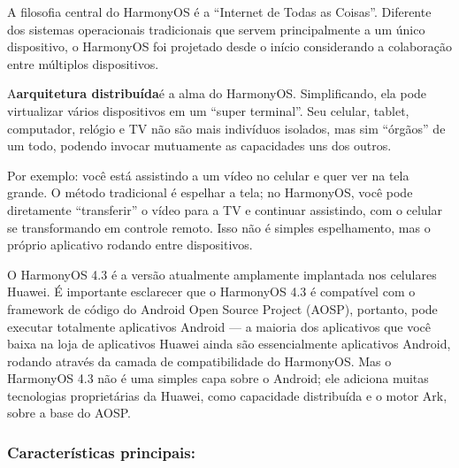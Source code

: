 


A filosofia central do HarmonyOS é a “Internet de Todas as Coisas”. Diferente dos sistemas operacionais tradicionais que servem principalmente a um único dispositivo, o HarmonyOS foi projetado desde o início considerando a colaboração entre múltiplos dispositivos.

A\textbf{arquitetura distribuída}é a alma do HarmonyOS. Simplificando, ela pode virtualizar vários dispositivos em um “super terminal”. Seu celular, tablet, computador, relógio e TV não são mais indivíduos isolados, mas sim “órgãos” de um todo, podendo invocar mutuamente as capacidades uns dos outros.

Por exemplo: você está assistindo a um vídeo no celular e quer ver na tela grande. O método tradicional é espelhar a tela; no HarmonyOS, você pode diretamente “transferir” o vídeo para a TV e continuar assistindo, com o celular se transformando em controle remoto. Isso não é simples espelhamento, mas o próprio aplicativo rodando entre dispositivos.


O HarmonyOS 4.3 é a versão atualmente amplamente implantada nos celulares Huawei. É importante esclarecer que o HarmonyOS 4.3 é compatível com o framework de código do Android Open Source Project (AOSP), portanto, pode executar totalmente aplicativos Android — a maioria dos aplicativos que você baixa na loja de aplicativos Huawei ainda são essencialmente aplicativos Android, rodando através da camada de compatibilidade do HarmonyOS. Mas o HarmonyOS 4.3 não é uma simples capa sobre o Android; ele adiciona muitas tecnologias proprietárias da Huawei, como capacidade distribuída e o motor Ark, sobre a base do AOSP.

\subsubsection*{Características principais:}

